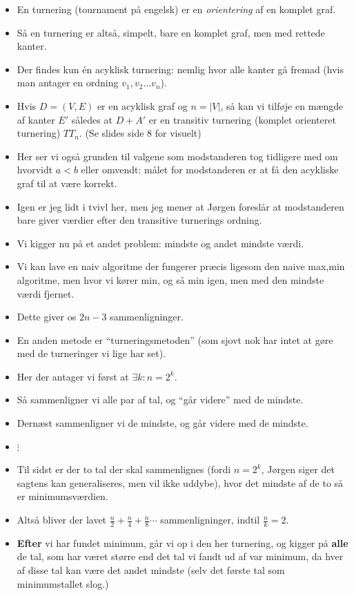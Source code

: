 \begin{frame}[allowframebreaks]
\begin{itemize}
		\item En turnering (tournament på engelsk) er en \textit{orientering} af en komplet graf.
		\item Så en turnering er altså, simpelt, bare en komplet graf, men med rettede kanter.
		\item Der findes kun én acyklisk turnering: nemlig hvor alle kanter gå fremad (hvis man antager en ordning $v_{1}, v_{2} \ldots v_{n}$).
		\item Hvis $D = (V,E)$ er en acyklisk graf og $n = |V|$, så kan vi tilføje en mængde af kanter $E'$ således at $D + A'$ er en transitiv turnering (komplet orienteret turnering) $TT_{n}$. (Se slides side 8 for visuelt)
		\item Her ser vi også grunden til valgene som modstanderen tog tidligere med om hvorvidt $a < b$ eller omvendt: målet for modstanderen er at få den acykliske graf til at være korrekt.
		\item Igen er jeg lidt i tvivl her, men jeg mener at Jørgen foreslår at modstanderen bare giver værdier efter den transitive turnerings ordning.
		\item Vi kigger nu på et andet problem: mindste og andet mindste værdi.
		\item Vi kan lave en naiv algoritme der fungerer præcis ligesom den naive max,min algoritme, men hvor vi kører min, og så min igen, men med den mindste værdi fjernet.
		\item Dette giver os $2n-3$ sammenligninger.
		\item En anden metode er ``turneringsmetoden'' (som sjovt nok har intet at gøre med de turneringer vi lige har set).
		\item Her der antager vi først at $\exists k : n = 2^{k}$.
		\item Så sammenligner vi alle par af tal, og ``går videre'' med de mindste.
		\item Dernæst sammenligner vi de mindste, og går videre med de mindste.
		\item $\vdots$
		\item Til sidst er der to tal der skal sammenlignes (fordi $n = 2^{k}$, Jørgen siger det sagtens kan generaliseres, men vil ikke uddybe), hvor det mindste af de to så er minimumsværdien.
		\item Altså bliver der lavet $\frac{n}{2} + \frac{n}{4} + \frac{n}{8} \cdots$ sammenligninger, indtil $\frac{n}{k} = 2$.
		\item \textbf{Efter} vi har fundet minimum, går vi op i den her turnering, og kigger på \textbf{alle} de tal, som har været større end det tal vi fandt ud af var minimum, da hver af disse tal kan være det andet mindste (selv det første tal som minimumstallet slog.)

\end{itemize}
\end{frame}
